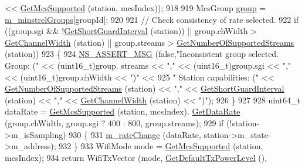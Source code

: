 \begin{DoxyCode}
      << \hyperlink{classns3_1_1WifiRemoteStationManager_af21ecff608cea2837c1af9385bbe6e4e}{GetMcsSupported} (station, mcsIndex));
918 
919       McsGroup \hyperlink{namespacevisualizer_1_1higcontainer_aa6ad2b76790275bfce7783429beaa23f}{group} = \hyperlink{classns3_1_1MinstrelHtWifiManager_a231741ce3f38417925019aa598570468}{m\_minstrelGroups}[groupId];
920 
921       \textcolor{comment}{// Check consistency of rate selected.}
922       \textcolor{keywordflow}{if} ((group.sgi && !\hyperlink{classns3_1_1WifiRemoteStationManager_aa55f6cb04128c88710119c8289f1b17e}{GetShortGuardInterval} (station)) || group.chWidth > 
      \hyperlink{classns3_1_1WifiRemoteStationManager_a918213c5b9fa629c4986f6d90521bbd4}{GetChannelWidth} (station)  ||  group.streams > 
      \hyperlink{classns3_1_1WifiRemoteStationManager_a5b08585f67c512242a2f3a53eeedade3}{GetNumberOfSupportedStreams} (station))
923         \{
924           \hyperlink{assert_8h_aff5ece9066c74e681e74999856f08539}{NS\_ASSERT\_MSG} (\textcolor{keyword}{false},\textcolor{stringliteral}{"Inconsistent group selected. Group: ("} << (uint16\_t)group.
      streams << \textcolor{stringliteral}{","} << (uint16\_t)group.sgi << \textcolor{stringliteral}{","} << (uint16\_t)group.chWidth << \textcolor{stringliteral}{")"} <<
925                          \textcolor{stringliteral}{" Station capabilities: ("} << 
      \hyperlink{classns3_1_1WifiRemoteStationManager_a5b08585f67c512242a2f3a53eeedade3}{GetNumberOfSupportedStreams} (station) << \textcolor{stringliteral}{","} << 
      \hyperlink{classns3_1_1WifiRemoteStationManager_aa55f6cb04128c88710119c8289f1b17e}{GetShortGuardInterval} (station) << \textcolor{stringliteral}{","} << \hyperlink{classns3_1_1WifiRemoteStationManager_a918213c5b9fa629c4986f6d90521bbd4}{GetChannelWidth} (station) << \textcolor{stringliteral}{
      ")"});
926         \}
927 
928       uint64\_t dataRate = \hyperlink{classns3_1_1WifiRemoteStationManager_af21ecff608cea2837c1af9385bbe6e4e}{GetMcsSupported} (station, mcsIndex).
      \hyperlink{classns3_1_1WifiMode_adcfbe150f69da720db23387f733b8a52}{GetDataRate} (group.chWidth, group.sgi ? 400 : 800, group.streams);
929       \textcolor{keywordflow}{if} (!station->m\_isSampling)
930         \{
931           \hyperlink{classns3_1_1MinstrelHtWifiManager_a40f1adcf50b778a96c87e16db15e950f}{m\_rateChange} (dataRate, station->m\_state->m\_address);
932         \}
933       WifiMode mode = \hyperlink{classns3_1_1WifiRemoteStationManager_af21ecff608cea2837c1af9385bbe6e4e}{GetMcsSupported} (station, mcsIndex);
934       \textcolor{keywordflow}{return} WifiTxVector (mode, \hyperlink{classns3_1_1WifiRemoteStationManager_acff2fc859ee6b4c66ea7a83dd075b5d6}{GetDefaultTxPowerLevel} (), 

\end{DoxyCode}
